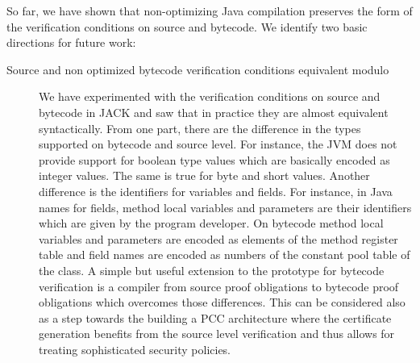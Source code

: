 So far, we have shown that non-optimizing Java compilation
 preserves the  form of the verification conditions on source and
 bytecode.  We identify two basic directions for future work:
\begin{description}
 \item[Source and non optimized bytecode verification conditions equivalent modulo] %
We have experimented with the verification conditions on source and
 bytecode in JACK and saw that in practice they are almost equivalent
 syntactically. From one part, there are the difference in the types 
 supported on bytecode and source level. For instance, the JVM does not
 provide support for boolean type values which are basically encoded as
 integer values. The same is true for byte and short values.  Another
 difference is the identifiers for variables and fields. For instance, in Java
 names for fields, method local variables and parameters are their identifiers which are given by the
 program developer. On bytecode method local variables and parameters are encoded as elements of the
 method register table and field names are encoded as numbers of the constant
 pool table of the class. A  simple but useful extension to the prototype for
 bytecode verification is a compiler from source proof obligations to bytecode proof obligations
 which overcomes those differences. This can be considered also as a step
 towards the  building a PCC architecture where the certificate generation benefits from
 the source level verification and thus allows for treating sophisticated
 security policies.


\end{description}

